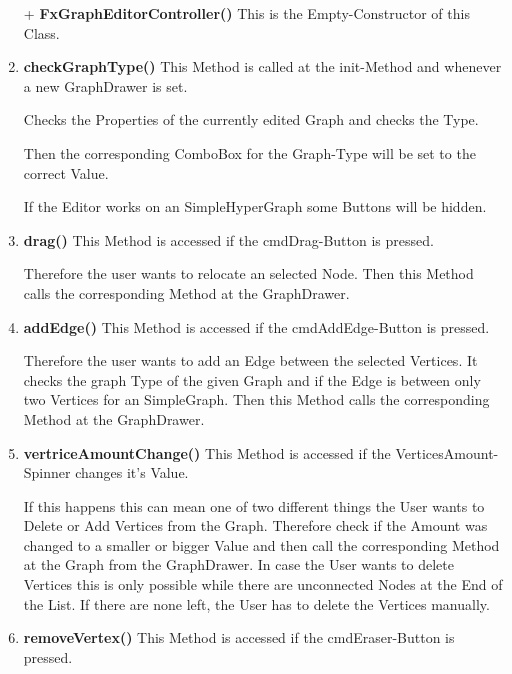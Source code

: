 \documentclass{article}
\begin{document}
				\begin{enumerate}[-]
					\item[+]{
						\textbf{FxGraphEditorController()} \newline
						This is the Empty-Constructor of this Class.
						\newline
					}
					\item{
						\textbf{checkGraphType()} \newline
						This Method is called at the init-Method and whenever a new GraphDrawer is set.
						
						Checks the Properties of the currently edited Graph and checks the Type.
						
						Then the corresponding ComboBox for the Graph-Type will be set to the correct Value.
						
						If the Editor works on an SimpleHyperGraph some Buttons will be hidden.
						\newline
					}
					\item{
						\textbf{drag()} \newline
						This Method is accessed if the cmdDrag-Button is pressed.
						
						Therefore the user wants to relocate an selected Node.
						Then this Method calls the corresponding Method at the GraphDrawer.
						\newline
					}
					\item{
						\textbf{addEdge()} \newline
						This Method is accessed if the cmdAddEdge-Button is pressed.
						
						Therefore the user wants to add an Edge between the selected Vertices.
						It checks the graph Type of the given Graph and if the Edge is between only two Vertices for an SimpleGraph.
						Then this Method calls the corresponding Method at the GraphDrawer.
						\newline
					}
					\item{
						\textbf{vertriceAmountChange()} \newline
						This Method is accessed if the VerticesAmount-Spinner changes it's Value.
						
						If this happens this can mean one of two different things the User wants to Delete or Add Vertices from the Graph.
						Therefore check if the Amount was changed to a smaller or bigger Value and then call the corresponding Method at the Graph from the GraphDrawer.
						In case the User wants to delete Vertices this is only possible while there are unconnected Nodes at the End of the List. If there are none left, the User has to delete the Vertices manually.
						\newline
					}
					\item{
						\textbf{removeVertex()} \newline
						This Method is accessed if the cmdEraser-Button is pressed.
						
}
\end{enumerate}
\end{document}
